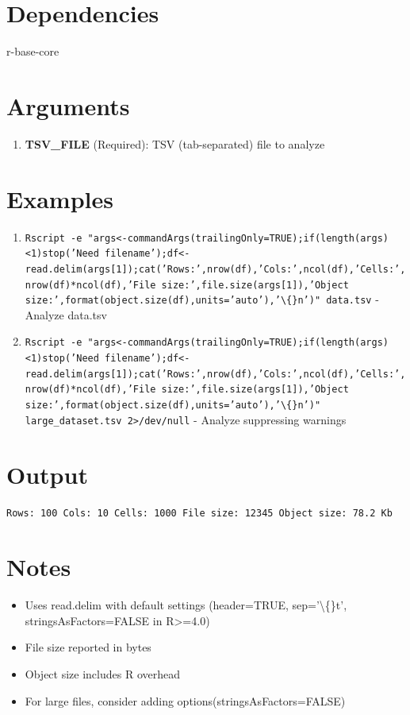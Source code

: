 \documentclass[openany]{book}
\begin{document}
\section*{Dependencies}
r-base-core


\section*{Arguments}
\begin{enumerate}
  \item \textbf{TSV\_FILE} (Required): TSV (tab-separated) file to analyze
\end{enumerate}

\section*{Examples}
\begin{enumerate}
  \item \texttt{Rscript -e "args<-commandArgs(trailingOnly=TRUE);if(length(args)<1)stop('Need filename');df<-read.delim(args[1]);cat('Rows:',nrow(df),'Cols:',ncol(df),'Cells:',nrow(df)*ncol(df),'File size:',file.size(args[1]),'Object size:',format(object.size(df),units='auto'),'\textbackslash\{\}n')" data.tsv} - Analyze data.tsv
  \item \texttt{Rscript -e "args<-commandArgs(trailingOnly=TRUE);if(length(args)<1)stop('Need filename');df<-read.delim(args[1]);cat('Rows:',nrow(df),'Cols:',ncol(df),'Cells:',nrow(df)*ncol(df),'File size:',file.size(args[1]),'Object size:',format(object.size(df),units='auto'),'\textbackslash\{\}n')" large\_dataset.tsv 2>/dev/null} - Analyze suppressing warnings
\end{enumerate}

\section*{Output}
\begin{lstlisting}
Rows: 100 Cols: 10 Cells: 1000 File size: 12345 Object size: 78.2 Kb

\end{lstlisting}

\section*{Notes}
\begin{itemize}
  \item Uses read.delim with default settings (header=TRUE, sep='\textbackslash\{\}t', stringsAsFactors=FALSE in R>=4.0)
  \item File size reported in bytes
  \item Object size includes R overhead
  \item For large files, consider adding options(stringsAsFactors=FALSE)
\end{itemize}
\end{document}
